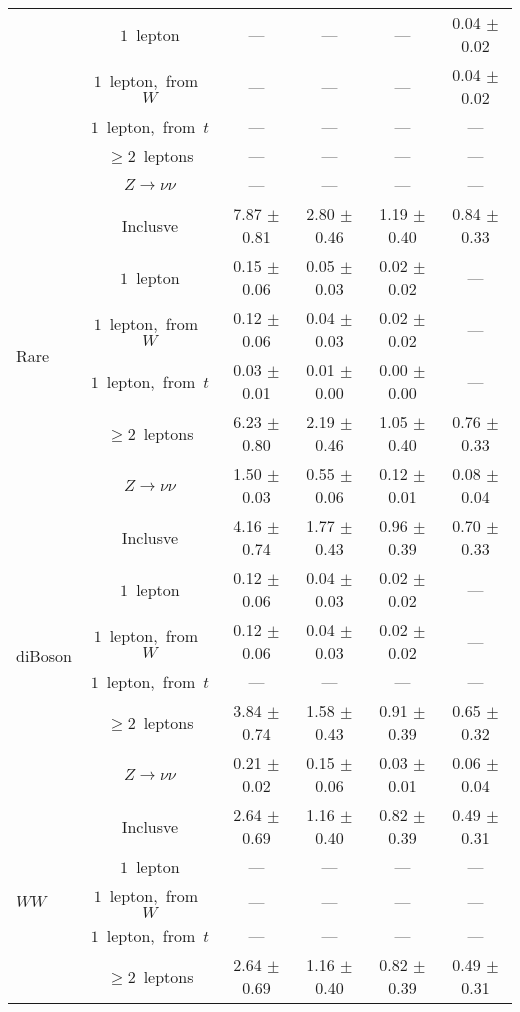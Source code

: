 \documentclass{article}
\begin{document}
\begin{longtable}{|l|c|c|c|c|c|}
 & $1$~lepton  & ---  & ---  & ---  & 0.04 $\pm$ 0.02 \\* 
 & $1$~lepton,~from~$W$  & ---  & ---  & ---  & 0.04 $\pm$ 0.02 \\* 
 & $1$~lepton,~from~$t$  & ---  & ---  & ---  & --- \\* 
 & $\ge2$~leptons  & ---  & ---  & ---  & --- \\* 
 & $Z\rightarrow\nu\nu$  & ---  & ---  & ---  & --- \\* 
\hline 
\multirow{6}{*}{Rare} & Inclusve  & 7.87 $\pm$ 0.81  & 2.80 $\pm$ 0.46  & 1.19 $\pm$ 0.40  & 0.84 $\pm$ 0.33 \\* 
 & $1$~lepton  & 0.15 $\pm$ 0.06  & 0.05 $\pm$ 0.03  & 0.02 $\pm$ 0.02  & --- \\* 
 & $1$~lepton,~from~$W$  & 0.12 $\pm$ 0.06  & 0.04 $\pm$ 0.03  & 0.02 $\pm$ 0.02  & --- \\* 
 & $1$~lepton,~from~$t$  & 0.03 $\pm$ 0.01  & 0.01 $\pm$ 0.00  & 0.00 $\pm$ 0.00  & --- \\* 
 & $\ge2$~leptons  & 6.23 $\pm$ 0.80  & 2.19 $\pm$ 0.46  & 1.05 $\pm$ 0.40  & 0.76 $\pm$ 0.33 \\* 
 & $Z\rightarrow\nu\nu$  & 1.50 $\pm$ 0.03  & 0.55 $\pm$ 0.06  & 0.12 $\pm$ 0.01  & 0.08 $\pm$ 0.04 \\* 
\hline 
\multirow{6}{*}{diBoson} & Inclusve  & 4.16 $\pm$ 0.74  & 1.77 $\pm$ 0.43  & 0.96 $\pm$ 0.39  & 0.70 $\pm$ 0.33 \\* 
 & $1$~lepton  & 0.12 $\pm$ 0.06  & 0.04 $\pm$ 0.03  & 0.02 $\pm$ 0.02  & --- \\* 
 & $1$~lepton,~from~$W$  & 0.12 $\pm$ 0.06  & 0.04 $\pm$ 0.03  & 0.02 $\pm$ 0.02  & --- \\* 
 & $1$~lepton,~from~$t$  & ---  & ---  & ---  & --- \\* 
 & $\ge2$~leptons  & 3.84 $\pm$ 0.74  & 1.58 $\pm$ 0.43  & 0.91 $\pm$ 0.39  & 0.65 $\pm$ 0.32 \\* 
 & $Z\rightarrow\nu\nu$  & 0.21 $\pm$ 0.02  & 0.15 $\pm$ 0.06  & 0.03 $\pm$ 0.01  & 0.06 $\pm$ 0.04 \\* 
\hline 
\multirow{6}{*}{$WW$} & Inclusve  & 2.64 $\pm$ 0.69  & 1.16 $\pm$ 0.40  & 0.82 $\pm$ 0.39  & 0.49 $\pm$ 0.31 \\* 
 & $1$~lepton  & ---  & ---  & ---  & --- \\* 
 & $1$~lepton,~from~$W$  & ---  & ---  & ---  & --- \\* 
 & $1$~lepton,~from~$t$  & ---  & ---  & ---  & --- \\* 
 & $\ge2$~leptons  & 2.64 $\pm$ 0.69  & 1.16 $\pm$ 0.40  & 0.82 $\pm$ 0.39  & 0.49 $\pm$ 0.31 \\* 

\end{longtable}
\end{document}

